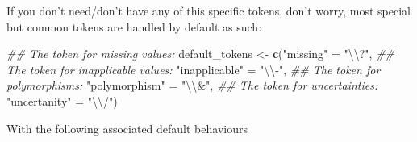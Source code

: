 \documentclass[
]{book}
\newenvironment{Shaded}{\begin{snugshade}}{\end{snugshade}}
\newcommand{\CharTok}[1]{\textcolor[rgb]{0.31,0.60,0.02}{#1}}
\newcommand{\CommentTok}[1]{\textcolor[rgb]{0.56,0.35,0.01}{\textit{#1}}}
\newcommand{\ControlFlowTok}[1]{\textcolor[rgb]{0.13,0.29,0.53}{\textbf{#1}}}
\newcommand{\DecValTok}[1]{\textcolor[rgb]{0.00,0.00,0.81}{#1}}
\newcommand{\KeywordTok}[1]{\textcolor[rgb]{0.13,0.29,0.53}{\textbf{#1}}}
\newcommand{\NormalTok}[1]{#1}
\newcommand{\OperatorTok}[1]{\textcolor[rgb]{0.81,0.36,0.00}{\textbf{#1}}}
\newcommand{\StringTok}[1]{\textcolor[rgb]{0.31,0.60,0.02}{#1}}
\begin{document}
\begin{Shaded}
\end{Shaded}

If you don't need/don't have any of this specific tokens, don't worry, most special but common tokens are handled by default as such:

\begin{Shaded}
\begin{Highlighting}[]
\CommentTok{\#\# The token for missing values:}
\NormalTok{default\_tokens \textless{}{-}}\StringTok{ }\KeywordTok{c}\NormalTok{(}\StringTok{"missing"}\NormalTok{      =}\StringTok{ "}\CharTok{\textbackslash{}\textbackslash{}}\StringTok{?"}\NormalTok{,}
\CommentTok{\#\# The token for inapplicable values:                    }
                    \StringTok{"inapplicable"}\NormalTok{ =}\StringTok{ "}\CharTok{\textbackslash{}\textbackslash{}}\StringTok{{-}"}\NormalTok{,}
\CommentTok{\#\# The token for polymorphisms:}
                    \StringTok{"polymorphism"}\NormalTok{ =}\StringTok{ "}\CharTok{\textbackslash{}\textbackslash{}}\StringTok{\&"}\NormalTok{,}
\CommentTok{\#\# The token for uncertainties:}
                    \StringTok{"uncertanity"}\NormalTok{  =}\StringTok{ "}\CharTok{\textbackslash{}\textbackslash{}}\StringTok{/"}\NormalTok{)}
\end{Highlighting}
\end{Shaded}

With the following associated default behaviours
\end{document}
